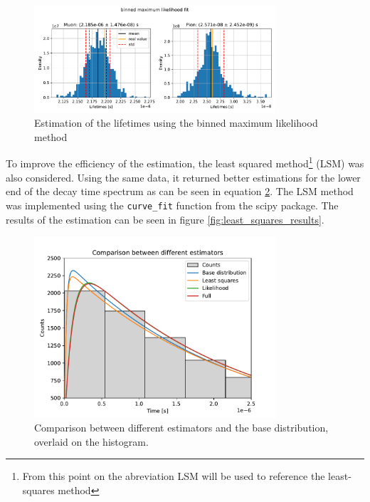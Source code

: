 \documentclass[11pt, a4paper, oneside]{book}
\newcommand\Plotwidth{0.8}
\begin{document}
\begin{figure}[H]
    \centering
    \includegraphics[width=\Plotwidth\textwidth]{images/estimators_hist_likelihood.pdf}
    \caption{Estimation of the lifetimes using the binned maximum likelihood method}
    \label{fig:likelihood_results}
\end{figure}

To improve the efficiency of the estimation, the least squared method\footnote{From this point on the abreviation LSM will be used to reference the least-squares method} (LSM) was also considered. Using the same data, it returned better estimations for the lower end of the decay time spectrum as can be seen in equation \ref{fig:comparison_estimators}. The LSM method was implemented using the \lstinline|curve_fit| function from the scipy package. The results of the estimation can be seen in figure \ref{fig:least_squares_results}.

\begin{figure}[H]
    \centering
    \includegraphics[width=\Plotwidth\textwidth]{images/comparison_estimators.pdf}
    \caption{Comparison between different estimators and the base distribution, overlaid on the histogram.}
    \label{fig:comparison_estimators}
\end{figure}
\end{document}
